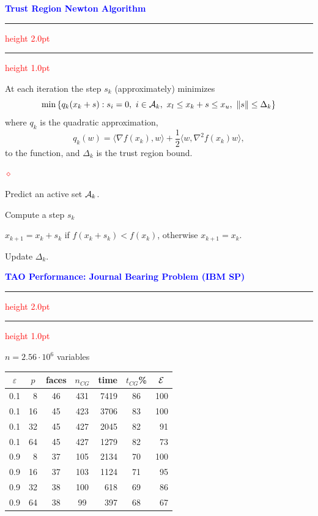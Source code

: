 \documentclass{seminar}
\newcommand{\grad}{\nabla}
\newcommand{\half}{{\textstyle{\frac{1}{2}}}}
\newcommand{\cA} {\mbox{$\cal A$}}
\newcommand{\reddiamond}{\textcolor{red}{$\diamond$}}
\newcommand{\redstripe}{\textcolor{red}{\hrule height 2.0pt\hfil}
             \vspace{-1.8pt}
             \textcolor{red}{\hrule height 1.0pt\hfil}
}
\newcommand{\heading}[1]{%
   \centerline{\textcolor{blue}{\textbf{#1}}}%
    \redstripe%
    \bigskip
}
\begin{document}
\begin{slide}

\heading{Trust Region Newton Algorithm}

At each iteration the step $s_k$  (approximately) minimizes 
\[
\min 
\left \{ 
q_k ( x_k + s ) : s_i = 0, \ i \in \cA_k , \
x_l \le x_k + s \le x_u , \ \| s \| \le \Delta_k 
\right \}
\]
where $ q_k $ is the quadratic approximation,
\[
q_k (w) = \langle \grad f (x_k ) , w \rangle + 
\half \langle w , \grad ^2 f(x_k) w \rangle ,
\]
to the function, and $ \Delta_k $ is the trust region bound.
\medskip

\begin{list}{\reddiamond}
{
\setlength{\itemsep}{0pt}
\setlength{\parsep}{0pt}
}
\item
Predict an active set $ \cA_k $.
\item
Compute a step $ s_k $ 
\item
$ x_{k+1} = x_k + s_k $ if $ f (x_k + s_k ) < f (x_k) $, 
otherwise $ x_{k+1} = x_k $.
\item
Update $ \Delta_k $.
\end{list}

\vfill

\end{slide}


\begin{slide}

\heading{TAO Performance: Journal Bearing Problem (IBM SP)}

\centerline{$ n = 2.56 \cdot 10^6 $ variables}

\small
\begin{table}[htbp]
\begin{center}
\begin{tabular}{| c r | c c r c r |}
\hline
\multicolumn{1}{|c}{$ \varepsilon $} & 
\multicolumn{1}{c|}{$ p $} & 
\multicolumn{1}{c}{faces} &
\multicolumn{1}{c}{$n_{CG}$} & 
\multicolumn{1}{c}{time} &
\multicolumn{1}{c}{$t_{CG}$\%} & 
\multicolumn{1}{c|}{$ \cal E $} \\ \hline
0.1  & 8 & 46 & 431 & 7419 & 86 & 100  \\ 
0.1  & 16 & 45 & 423 & 3706 & 83 & 100  \\
0.1  & 32 & 45 & 427 & 2045 & 82 & 91 \\
0.1  & 64 & 45 & 427 & 1279 & 82 & 73 \\
\hline
0.9  & 8 & 37 & 105 & 2134 & 70 & 100 \\
0.9  & 16 & 37 & 103 & 1124 & 71 & 95 \\
0.9  & 32 & 38 & 100 & 618 & 69 & 86 \\
0.9  & 64 & 38 & 99 & 397 & 68 & 67 \\
\hline
\end{tabular}
\end{center}
\end{table}

\vfill

\end{slide}
\end{document}
